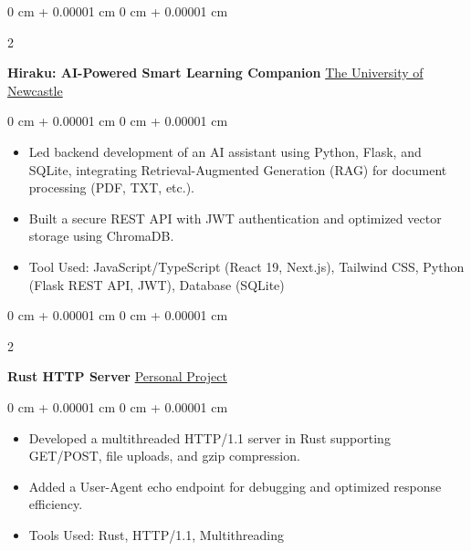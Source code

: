 \documentclass[10pt, letterpaper]{article}
\newenvironment{highlights}{
    \begin{itemize}[
        topsep=0.10 cm,
        parsep=0.10 cm,
        partopsep=0pt,
        itemsep=0pt,
        leftmargin=0 cm + 10pt
    ]
}{
    \end{itemize}
} %
\newenvironment{onecolentry}{
    \begin{adjustwidth}{
        0 cm + 0.00001 cm
    }{
        0 cm + 0.00001 cm
    }
}{
    \end{adjustwidth}
} %
\newenvironment{twocolentry}[2][]{
    \onecolentry
    \def\secondColumn{#2}
    \setcolumnwidth{\fill, 4.5 cm}
    \begin{paracol}{2}
}{
    \switchcolumn \raggedleft \secondColumn
    \end{paracol}
    \endonecolentry
} %
\begin{document}
        \vspace{0.2 cm}
        
        \begin{twocolentry}{
            \href{https://github.com/yuann3/Hiraku-RAG}{The University of Newcastle}
        }
            \textbf{Hiraku: AI-Powered Smart Learning Companion}\end{twocolentry}

        \vspace{0.10 cm}
        \begin{onecolentry}
            \begin{highlights}
                \item Led backend development of an AI assistant using Python, Flask, and SQLite, integrating Retrieval-Augmented Generation (RAG) for document processing (PDF, TXT, etc.).
                \item Built a secure REST API with JWT authentication and optimized vector storage using ChromaDB.
                \item Tool Used: JavaScript/TypeScript (React 19, Next.js), Tailwind CSS, Python (Flask REST API, JWT), Database (SQLite)
            \end{highlights}
        \end{onecolentry}


        \vspace{0.2 cm}

        \begin{twocolentry}{
            \href{https://github.com/yuann3/http-rust/}{Personal Project}
        }
            \textbf{Rust HTTP Server}\end{twocolentry}

        \vspace{0.10 cm}
        \begin{onecolentry}
            \begin{highlights}
                \item Developed a multithreaded HTTP/1.1 server in Rust supporting GET/POST, file uploads, and gzip compression.
                \item Added a User-Agent echo endpoint for debugging and optimized response efficiency.
                \item Tools Used: Rust, HTTP/1.1, Multithreading
            \end{highlights}
        \end{onecolentry}


        \vspace{0.2 cm}
\end{document}
